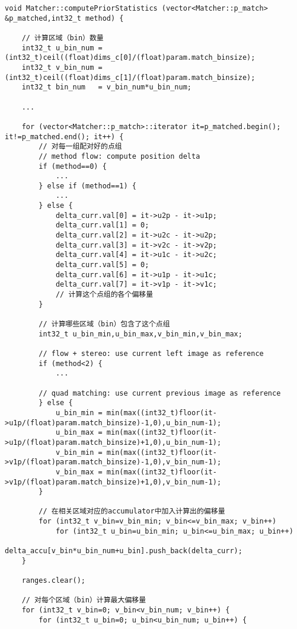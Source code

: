 \documentclass[UTF8]{ctexart}
\begin{document}
    \begin{verbatim}
void Matcher::computePriorStatistics (vector<Matcher::p_match> &p_matched,int32_t method) {
    
    // 计算区域（bin）数量
    int32_t u_bin_num = (int32_t)ceil((float)dims_c[0]/(float)param.match_binsize);
    int32_t v_bin_num = (int32_t)ceil((float)dims_c[1]/(float)param.match_binsize);
    int32_t bin_num   = v_bin_num*u_bin_num;
    
    ...

    for (vector<Matcher::p_match>::iterator it=p_matched.begin(); it!=p_matched.end(); it++) {
        // 对每一组配对好的点组
        // method flow: compute position delta
        if (method==0) {
            ... 
        } else if (method==1) {
            ... 
        } else {
            delta_curr.val[0] = it->u2p - it->u1p;
            delta_curr.val[1] = 0;
            delta_curr.val[2] = it->u2c - it->u2p;
            delta_curr.val[3] = it->v2c - it->v2p;
            delta_curr.val[4] = it->u1c - it->u2c;
            delta_curr.val[5] = 0;
            delta_curr.val[6] = it->u1p - it->u1c;
            delta_curr.val[7] = it->v1p - it->v1c;
            // 计算这个点组的各个偏移量
        }
        
        // 计算哪些区域（bin）包含了这个点组
        int32_t u_bin_min,u_bin_max,v_bin_min,v_bin_max;

        // flow + stereo: use current left image as reference
        if (method<2) {
            ...
        
        // quad matching: use current previous image as reference
        } else {
            u_bin_min = min(max((int32_t)floor(it->u1p/(float)param.match_binsize)-1,0),u_bin_num-1);
            u_bin_max = min(max((int32_t)floor(it->u1p/(float)param.match_binsize)+1,0),u_bin_num-1);
            v_bin_min = min(max((int32_t)floor(it->v1p/(float)param.match_binsize)-1,0),v_bin_num-1);
            v_bin_max = min(max((int32_t)floor(it->v1p/(float)param.match_binsize)+1,0),v_bin_num-1);
        }
        
        // 在相关区域对应的accumulator中加入计算出的偏移量
        for (int32_t v_bin=v_bin_min; v_bin<=v_bin_max; v_bin++)
            for (int32_t u_bin=u_bin_min; u_bin<=u_bin_max; u_bin++)
                delta_accu[v_bin*u_bin_num+u_bin].push_back(delta_curr);
    }
    
    ranges.clear();
    
    // 对每个区域（bin）计算最大偏移量
    for (int32_t v_bin=0; v_bin<v_bin_num; v_bin++) {
        for (int32_t u_bin=0; u_bin<u_bin_num; u_bin++) {
            

\end{verbatim}
\end{document}
